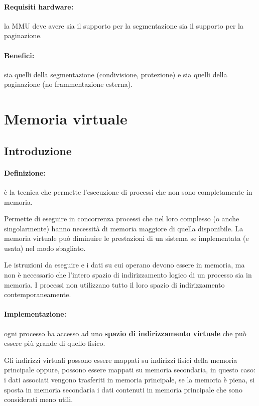 \paragraph{Requisiti hardware:} la MMU deve avere sia il supporto per la segmentazione sia il supporto per la paginazione.
\paragraph{Benefici:} sia quelli della segmentazione (condivisione, protezione) e sia quelli della paginazione (no frammentazione esterna).

\newpage

\section{Memoria virtuale}
\subsection{Introduzione}
\paragraph{Definizione:} è la tecnica che permette l'esecuzione di processi che non sono completamente in memoria.

Permette di eseguire in concorrenza processi che nel loro
complesso (o anche singolarmente) hanno necessità di memoria
maggiore di quella disponibile. La memoria virtuale può diminuire le prestazioni di un sistema se implementata (e usata) nel modo sbagliato.

Le istruzioni da eseguire e i dati su cui operano devono essere in memoria, ma non è necessario che l'intero spazio di indirizzamento logico di un processo sia in memoria. I processi non utilizzano tutto il loro spazio di indirizzamento contemporaneamente.

\paragraph{Implementazione:}
ogni processo ha accesso ad uno \textbf{spazio di indirizzamento virtuale} che può essere più grande di quello fisico. 

Gli indirizzi virtuali possono essere mappati su indirizzi fisici della memoria principale oppure, possono essere mappati su memoria secondaria, in questo caso: i dati associati vengono trasferiti in memoria principale, se la memoria è piena, si sposta in memoria secondaria i dati contenuti in memoria principale che sono considerati meno utili.

